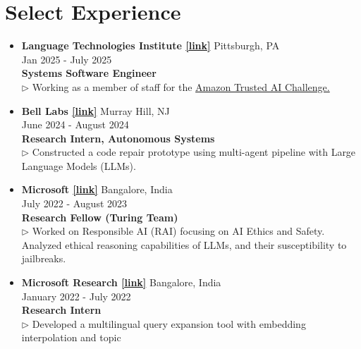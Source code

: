 \documentclass[11pt,letterpaper]{article}
\begin{document}
    \section*{Select Experience}
    \begin{itemize}[leftmargin=*,label={},itemsep=4pt]
        \item \textbf{Language Technologies Institute  \href{https://lti.cs.cmu.edu}{[link]}} \hfill Pittsburgh, PA\\
            \hfill Jan 2025 - July 2025\\
            \textbf{\textit{} Systems Software Engineer}\\
            $\triangleright$ Working as a member of staff for the \href{https://www.amazon.science/nova-ai-challenge}{Amazon Trusted AI Challenge.}
            \\
        \item \textbf{Bell Labs  \href{https://www.bell-labs.com/}{[link]}} \hfill Murray Hill, NJ\\
            \hfill June 2024 - August 2024\\
            \textbf{\textit{} Research Intern, Autonomous
                    Systems}\\
            $\triangleright$ Constructed a code repair prototype using multi-agent pipeline with Large Language
                Models (LLMs).\\
        \item \textbf{Microsoft  \href{https://www.microsoft.com/en-in/research/theme/artificial-intelligence/}{[link]}} \hfill Bangalore, India\\
            \hfill July 2022 - August 2023\\
            \textbf{\textit{} Research Fellow (Turing Team)}\\
            $\triangleright$ Worked on Responsible AI (RAI) focusing on AI Ethics and Safety. Analyzed ethical
                reasoning capabilities of LLMs, and their susceptibility to jailbreaks.\\
        \item \textbf{Microsoft Research  \href{https://www.microsoft.com/en-us/research/}{[link]}} \hfill Bangalore, India\\
            \hfill January 2022 - July 2022\\
            \textbf{\textit{} Research Intern}\\
            $\triangleright$ Developed a multilingual query expansion tool with embedding interpolation and topic

\end{itemize}
\end{document}
